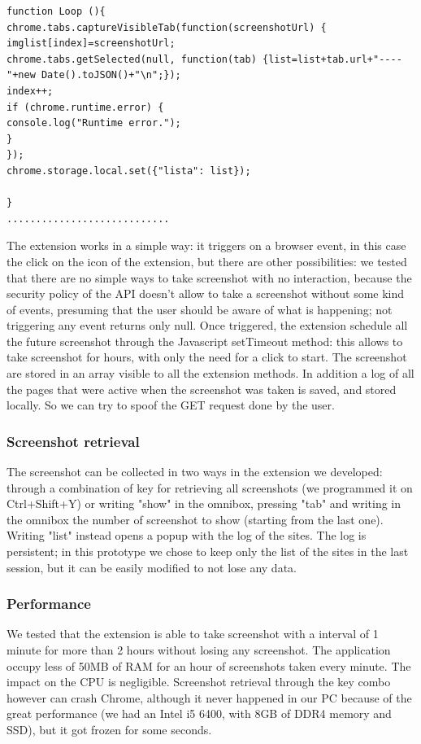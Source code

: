 \documentclass[12pt]{article}
\begin{document}
\begin{multicols}{2}
\begin{lstlisting}
function Loop (){
chrome.tabs.captureVisibleTab(function(screenshotUrl) {
imglist[index]=screenshotUrl;
chrome.tabs.getSelected(null, function(tab) {list=list+tab.url+"----"+new Date().toJSON()+"\n";});
index++;
if (chrome.runtime.error) {
console.log("Runtime error.");
}
}); 
chrome.storage.local.set({"lista": list});

}
............................
	\end{lstlisting}
	 The extension works in a simple way: it triggers on a browser event, in this case the click on the icon of the extension, but there are other possibilities: we tested that there are no simple ways to take screenshot with no interaction, because the security policy of the API doesn't allow to take a screenshot without some kind of events, presuming that the user should be aware of what is happening; not triggering any event returns only null.
Once triggered, the extension schedule all the future screenshot through the Javascript setTimeout method: this allows to take screenshot for hours, with only the need for a click to start.
The screenshot are stored in an array visible to all the extension methods.
In addition a log of all the pages that were active when the screenshot was taken is saved, and stored locally. So we can try to spoof the \textsc{GET} request done by the user.
\subsubsection*{Screenshot retrieval}
The screenshot can be collected in two ways in the extension we developed:
through a combination of key for retrieving all screenshots (we programmed it on Ctrl+Shift+Y) or writing "show" in the omnibox, pressing "tab" and writing in the omnibox the number of screenshot to show (starting from the last one). Writing "list" instead opens a popup with the log of the sites.
 The log is persistent; in this prototype we chose to keep only the list of the sites in the last session, but it can be easily modified to not lose any data.
\subsubsection*{Performance}
We tested that the extension is able to take screenshot with a interval of 1 minute for more than 2 hours without losing any screenshot.
The application occupy less of 50MB of RAM for an hour of screenshots taken every minute. The impact on the CPU is negligible.
Screenshot retrieval through the key combo however can crash Chrome, although it never happened in our PC because of the great performance (we had an Intel i5 6400, with 8GB of DDR4 memory and SSD), but it got frozen for some seconds.

\end{multicols}
\end{document}
